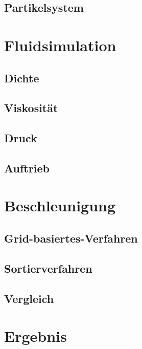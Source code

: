 \documentclass[intern,palatino]{cgBA}
\begin{document}
\subsection{Partikelsystem}


\section{Fluidsimulation}
\subsection{Dichte}
\subsection{Viskosität}
\subsection{Druck}
\subsection{Auftrieb}


\section{Beschleunigung}
\subsection{Grid-basiertes-Verfahren}
\subsection{Sortierverfahren}
\subsection{Vergleich}


\section{Ergebnis}

\end{document}
